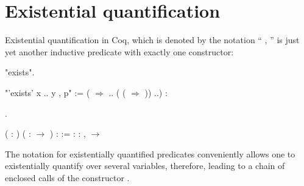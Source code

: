 \section{Existential quantification}


\label{sec:exists}


Existential quantification in Coq, which is denoted by the notation
`` ,  '' is just yet another inductive predicate with exactly
one constructor:


\begin{coqdoccode}
\coqdocemptyline
\coqdocnoindent
{} "exists".\coqdoceol
\coqdocemptyline
\end{coqdoccode}
\coqdoceol
\coqdocemptyline
\coqdocnoindent
"'exists' x .. y , p" :=  (  \ensuremath{\Rightarrow} .. ( (  \ensuremath{\Rightarrow} )) ..)\coqdoceol
\coqdocindent{11.00em}
: 

\coqdocemptyline


\begin{coqdoccode}
\coqdocemptyline
\coqdocnoindent
{} .\coqdoceol
\coqdocemptyline
\end{coqdoccode}
\coqdoceol
\coqdocemptyline
\coqdocnoindent
{}  ( : ) ( :  \ensuremath{\rightarrow} ) :  :=\coqdoceol
\coqdocindent{2.00em}
 : \coqdockw{\ensuremath{\forall}}  : ,   \ensuremath{\rightarrow}   

\coqdocemptyline




The notation for existentially quantified predicates conveniently
allows one to existentially quantify over several variables,
therefore, leading to a chain of enclosed calls of the constructor
.  


